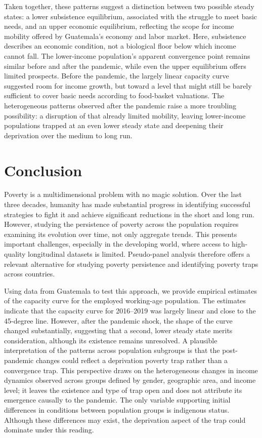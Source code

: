 \documentclass{article}
\begin{document}
Taken together, these patterns suggest a distinction between two possible steady states: a lower subsistence equilibrium, associated with the struggle to meet basic needs, and an upper economic equilibrium, reflecting the scope for income mobility offered by Guatemala's economy and labor market. Here, subsistence describes an economic condition, not a biological floor below which income cannot fall. The lower-income population's apparent convergence point remains similar before and after the pandemic, while even the upper equilibrium offers limited prospects. Before the pandemic, the largely linear capacity curve suggested room for income growth, but toward a level that might still be barely sufficient to cover basic needs according to food-basket valuations. The heterogeneous patterns observed after the pandemic raise a more troubling possibility: a disruption of that already limited mobility, leaving lower-income populations trapped at an even lower steady state and deepening their deprivation over the medium to long run.
\clearpage
\label{sec:results}

\clearpage

\section{Conclusion}
Poverty is a multidimensional problem with no magic solution. Over the last three decades, humanity has made substantial progress in identifying successful strategies to fight it and achieve significant reductions in the short and long run. However, studying the persistence of poverty across the population requires examining its evolution over time, not only aggregate trends. This presents important challenges, especially in the developing world, where access to high-quality longitudinal datasets is limited. Pseudo-panel analysis therefore offers a relevant alternative for studying poverty persistence and identifying poverty traps across countries.

Using data from Guatemala to test this approach, we provide empirical estimates of the capacity curve for the employed working-age population. The estimates indicate that the capacity curve for 2016--2019 was largely linear and close to the 45-degree line. However, after the pandemic shock, the shape of the curve changed substantially, suggesting that a second, lower steady state merits consideration, although its existence remains unresolved. A plausible interpretation of the patterns across population subgroups is that the post-pandemic changes could reflect a deprivation poverty trap rather than a convergence trap. This perspective draws on the heterogeneous changes in income dynamics observed across groups defined by gender, geographic area, and income level; it leaves the existence and type of trap open and does not attribute its emergence causally to the pandemic. The only variable supporting initial differences in conditions between population groups is indigenous status. Although these differences may exist, the deprivation aspect of the trap could dominate under this reading.
\end{document}
